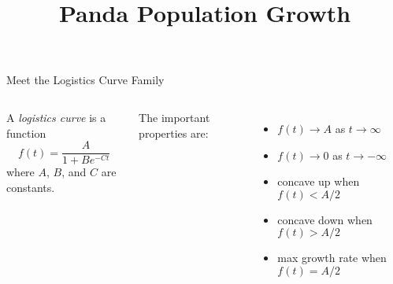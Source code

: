 \documentclass[10pt,aspectratio=1610,xcolor={dvipsnames}]{beamer}
\title{Panda Population Growth}
\begin{document}
  \begin{frame}
    \titlepage
  \end{frame}

  \begin{frame}{Meet the Logistics Curve Family}

    \begin{center}
      \scalebox{0.75}{}
    \end{center}

    \begin{columns}

      \begin{center}
        A \emph{logistics curve} is a function
        \[
          f(t) = \frac{A}{1 + Be^{-Ct}}
        \]
        where $A$, $B$, and $C$ are constants.
      \end{center}

      The important properties are:

      \begin{itemize}
        \item{$f(t) \to A$ as $t \to \infty$}
        \item{$f(t) \to 0$ as $t \to -\infty$}
        \item{concave up when $f(t) < A / 2$}
        \item{concave down when $f(t) > A / 2$}
        \item{max growth rate when $f(t) = A / 2$}
      \end{itemize}

    \end{columns}

  \end{frame}
\end{document}
